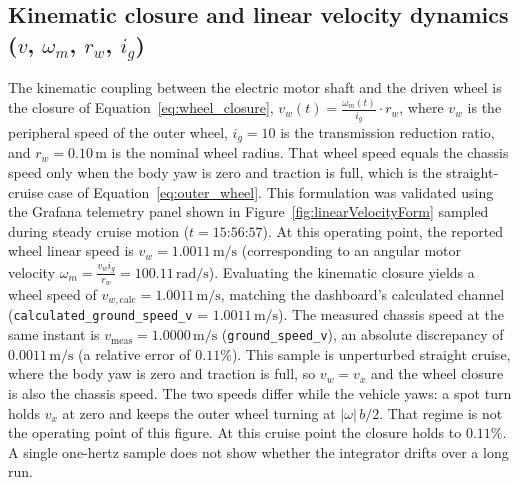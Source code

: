 \subsection{Kinematic closure and linear velocity dynamics (\texorpdfstring{$v$, $\omega_m$, $r_w$, $i_g$}{v, wm, rw, ig})}
The kinematic coupling between the electric motor shaft and the driven wheel is the closure of Equation~\eqref{eq:wheel_closure}, $v_w(t) = \frac{\omega_m(t)}{i_g} \cdot r_w$, where $v_w$ is the peripheral speed of the outer wheel, $i_g = 10$ is the transmission reduction ratio, and $r_w = 0.10\,\text{m}$ is the nominal wheel radius. That wheel speed equals the chassis speed only when the body yaw is zero and traction is full, which is the straight-cruise case of Equation~\eqref{eq:outer_wheel}. This formulation was validated using the Grafana telemetry panel shown in Figure~\ref{fig:linearVelocityForm} sampled during steady cruise motion ($t = \text{15:56:57}$). At this operating point, the reported wheel linear speed is $v_w = 1.0011\,\text{m/s}$ (corresponding to an angular motor velocity $\omega_m = \frac{v_w i_g}{r_w} = 100.11\,\text{rad/s}$). Evaluating the kinematic closure yields a wheel speed of $v_{w,\text{calc}} = 1.0011\,\text{m/s}$, matching the dashboard's calculated channel (\texttt{calculated\_ground\_speed\_v} = $1.0011\,\text{m/s}$). The measured chassis speed at the same instant is $v_{\text{meas}} = 1.0000\,\text{m/s}$ (\texttt{ground\_speed\_v}), an absolute discrepancy of $0.0011\,\text{m/s}$ (a relative error of $0.11\%$). This sample is unperturbed straight cruise, where the body yaw is zero and traction is full, so $v_w = v_x$ and the wheel closure is also the chassis speed. The two speeds differ while the vehicle yaws: a spot turn holds $v_x$ at zero and keeps the outer wheel turning at $|\omega|\,b/2$. That regime is not the operating point of this figure. At this cruise point the closure holds to $0.11\%$. A single one-hertz sample does not show whether the integrator drifts over a long run.

